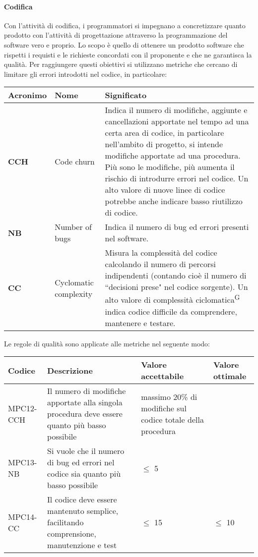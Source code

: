\paragraph{Codifica}
Con l'attività di codifica, i programmatori si impegnano a concretizzare quanto prodotto con l'attività di progettazione attraverso la programmazione del software vero e proprio.
Lo scopo è quello di ottenere un prodotto software che rispetti i requisti e le richieste concordati con il proponente e che ne garantisca la qualità. Per raggiungere questi obiettivi si utilizzano metriche che cercano di limitare gli errori introdotti nel codice, in particolare:
\begin{table}[h!]
\centering
\def\arraystretch{1.5}
\begin{tabular}{ |m{2cm}|m{2.5cm}|m{9.5cm}| }
\hline
\rowcolor{lightgray!30}
\textbf{Acronimo} & \textbf{Nome} & \textbf{Significato}\\
\hline
\textbf{CCH} & Code churn & Indica il numero di modifiche, aggiunte e cancellazioni apportate nel tempo ad una certa area di codice, in particolare nell'ambito di progetto, si intende modifiche apportate ad una procedura. Più sono le modifiche, più aumenta il rischio di introdurre errori nel codice. Un alto valore di nuove linee di codice potrebbe anche indicare basso riutilizzo di codice.\\
\hline
\textbf{NB} & Number of bugs & Indica il numero di bug ed errori presenti nel software.\\
\hline
\textbf{CC} & Cyclomatic complexity & Misura la complessità del codice calcolando il numero di percorsi indipendenti (contando cioè il numero di ``decisioni prese" nel codice sorgente). Un alto valore di complessità ciclomatica\textsuperscript{G} indica codice difficile da comprendere, mantenere e testare.\\
\hline
\end{tabular}
\end{table}
\par Le regole di qualità sono applicate alle metriche nel seguente modo:
\begin{table}[h!]
\centering
\def\arraystretch{1.5}
\begin{tabular}{ |>{\centering\arraybackslash}m{2.5cm}|>{\centering\arraybackslash}m{5.5cm}|>{\centering\arraybackslash}m{3cm}|>{\centering\arraybackslash}m{3cm}| }
\hline
\rowcolor{black}
\textbf{\color{white} Codice} & \textbf{\color{white} Descrizione} & \textbf{\color{white} Valore accettabile} & \textbf{\color{white} Valore ottimale}\\
\hline
MPC12-CCH & Il numero di modifiche apportate alla singola procedura deve essere quanto più basso possibile & massimo 20\% di modifiche sul codice totale della procedura & 0 \\
\hline
MPC13-NB & Si vuole che il numero di bug ed errori nel codice sia quanto più basso possibile & $\leq$ 5 & 0 \\
\hline
MPC14-CC & Il codice deve essere mantenuto semplice, facilitando comprensione, manutenzione e test & $\leq$ 15 & $\leq$ 10 \\
\hline
\end{tabular}
\end{table}

